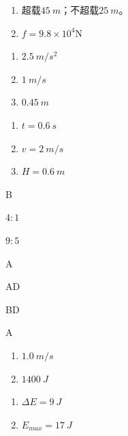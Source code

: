 \item \begin {enumerate} \renewcommand {\labelenumi }{\arabic {enumi}.} \item 超载$ 45\ m $；不超载$ 25\ m $。 \item $f = 9.8 \times 10 ^ { 4 } \mathrm { N }$ \par \end {enumerate} \par \par 
\item \begin {enumerate} \renewcommand {\labelenumi }{\arabic {enumi}.} \item $ 2.5\ m/s^{2} $ \item $ 1\ m/s $ \item $ 0.45\ m $ \par \end {enumerate} \par \par 
\item \begin {enumerate} \renewcommand {\labelenumi }{\arabic {enumi}.} \item $ t=0.6\ s $ \item $ v=2\ m/s $ \item $ H=0.6\ m $ \par \end {enumerate} \par \par 
\item B
\item $ 4:1 $
\item $ 9:5 $
\item A
\item AD
\item BD
\item A
\item \begin {enumerate} \renewcommand {\labelenumi }{\arabic {enumi}.} \item $ 1.0\ m/s $ \item $ 1400\ J $ \par \end {enumerate} \par \par 
\item \begin {enumerate} \renewcommand {\labelenumi }{\arabic {enumi}.} \item $\Delta E=9\ J$ \item $ E_{max}=17\ J $ \par \end {enumerate} \par \par 
